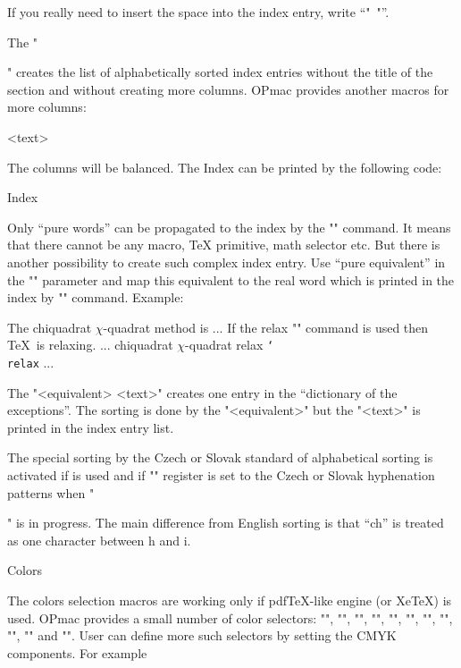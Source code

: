 If you really need to insert the space into the index entry, write ``"~"''.

The "\makeindex" creates the list of alphabetically sorted index entries
without the title of the section and without creating more columns. OPmac
provides another macros for more columns: 

\begtt
{}
<text>
\endmulti
\endtt

The columns will be balanced. The Index can be printed by the following
code:

\begtt
\sec Index\par
{} \makeindex \endmulti
\endtt

Only ``pure words'' can be propagated to the index by the "\ii" command. It
means that there cannot be any macro, \TeX{} primitive, math selector etc.
But there is another possibility to create such complex index entry. Use
``pure equivalent'' in the "\ii" parameter and map this equivalent to the
real word which is printed in the index by "\iis" command. Example:

\begtt
The \ii chiquadrat $\chi$-quadrat method is 
...
If the \ii relax "\relax" command is used then \TeX\ is relaxing.
...
\iis chiquadrat {$\chi$-quadrat}
\iis relax {{\tt \char`\\relax}}
...
\endtt

The "\iis <equivalent> {<text>}" creates one entry in the ``dictionary 
of the exceptions''. The sorting is done by the "<equivalent>" but the
"<text>" is printed in the index entry list.

The special sorting by the Czech or Slovak standard of alphabetical sorting
is activated if \csplain{} is used and if "\language" register is set to the
Czech or Slovak hyphenation patterns when "\makeindex" is in progress. The
main difference from English sorting is that ``ch'' is treated as one
character between h and i.


\sec Colors

The colors selection macros are working only if pdf\TeX-like engine (or
Xe\TeX) is used.
OPmac provides a small number of color selectors: 
{\localcolor\Blue "\Blue"}, 
{\localcolor\Red "\Red"}, 
{\localcolor\Brown "\Brown"},
{\localcolor\Green "\Green"}, 
{\localcolor\Yellow "\Yellow"}, 
{\localcolor\Cyan "\Cyan"}, 
{\localcolor\Magenta "\Magenta"}, 
{"\White"}, 
{\localcolor\Grey "\Grey"}, 
{\localcolor\LightGrey "\LightGrey"} and
"\Black". User can define more
such selectors by setting the CMYK components. For example

